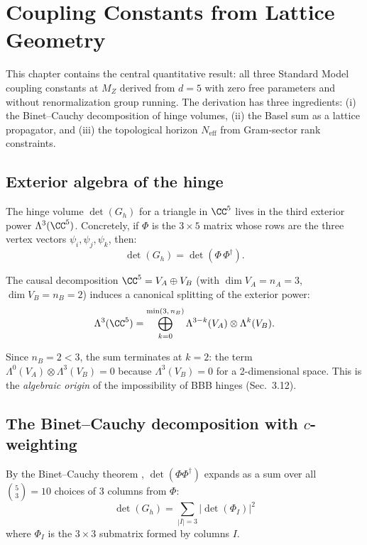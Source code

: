 \section{Coupling Constants from Lattice Geometry}
\label{ch:couplings}

This chapter contains the central quantitative result: all three Standard Model coupling constants at $M_Z$ derived from $d = 5$ with zero free parameters and without renormalization group running. The derivation has three ingredients: (i) the Binet--Cauchy decomposition of hinge volumes, (ii) the Basel sum as a lattice propagator, and (iii) the topological horizon $N_\text{eff}$ from Gram-sector rank constraints.

\subsection{Exterior algebra of the hinge}

The hinge volume $\det(G_h)$ for a triangle in $\CC^5$ lives in the third exterior power $\Lambda^3(\CC^5)$. Concretely, if $\Phi$ is the $3 \times 5$ matrix whose rows are the three vertex vectors $\psi_i, \psi_j, \psi_k$, then:
\begin{equation}
\det(G_h) = \det(\Phi\,\Phi^\dagger).
\end{equation}

The causal decomposition $\CC^5 = V_A \oplus V_B$ (with $\dim V_A = n_A = 3$, $\dim V_B = n_B = 2$) induces a canonical splitting of the exterior power:
\begin{equation}
\Lambda^3(\CC^5) = \bigoplus_{k=0}^{\min(3,\,n_B)} \Lambda^{3-k}(V_A) \otimes \Lambda^k(V_B).
\label{eq:exterior_split}
\end{equation}

Since $n_B = 2 < 3$, the sum terminates at $k = 2$: the term $\Lambda^0(V_A) \otimes \Lambda^3(V_B) = 0$ because $\Lambda^3(V_B) = 0$ for a 2-dimensional space. This is the \emph{algebraic origin} of the impossibility of BBB hinges (Sec.~3.12).

\subsection{The Binet--Cauchy decomposition with $c$-weighting}

By the Binet--Cauchy theorem \cite{BinetCauchy}, $\det(\Phi\Phi^\dagger)$ expands as a sum over all $\binom{5}{3} = 10$ choices of 3 columns from $\Phi$:
\begin{equation}
\det(G_h) = \sum_{|I| = 3} |\det(\Phi_I)|^2
\end{equation}
where $\Phi_I$ is the $3 \times 3$ submatrix formed by columns $I$.

